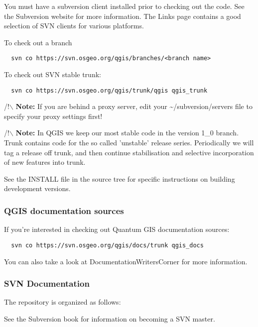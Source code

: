 You must have a subversion client installed prior to checking out the code. See
the Subversion website for more information. The Links page contains a good
selection of SVN clients for various platforms.

To check out a branch

\begin{verbatim}
  svn co https://svn.osgeo.org/qgis/branches/<branch name>
\end{verbatim}

To check out SVN stable trunk:

\begin{verbatim}
  svn co https://svn.osgeo.org/qgis/trunk/qgis qgis_trunk
\end{verbatim}

/!$\backslash$ \textbf{Note:} If you are behind a proxy server, edit your \~{}/subversion/servers
file to specify your proxy settings first!

/!$\backslash$ \textbf{Note:} In QGIS we keep our most stable code in the version 1\_0 branch.
Trunk contains code for the so called 'unstable' release series. Periodically
we will tag a release off trunk, and then continue stabilisation and selective
incorporation of new features into trunk.

See the INSTALL file in the source tree for specific instructions on building
development versions. 

\subsubsection{QGIS documentation sources}
If you're interested in checking out Quantum GIS documentation sources:

\begin{verbatim}
  svn co https://svn.osgeo.org/qgis/docs/trunk qgis_docs
\end{verbatim}

You can also take a look at DocumentationWritersCorner for more information.

\subsubsection{SVN Documentation}
The repository is organized as follows:


See the Subversion book  for information on becoming
a SVN master.

